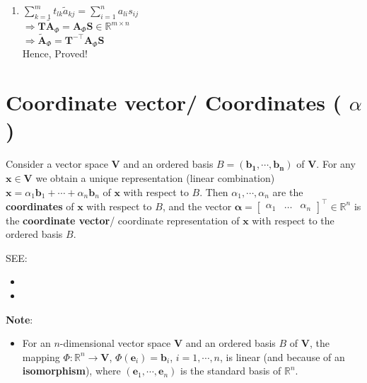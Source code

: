 \begin{enumerate}
    \item \( \displaystyle
        \sum_{k=1}^{m} t_{lk}\tilde{a}_{kj} = \sum_{i=1}^{n} a_{li}s_{ij} 
    \)\\
    \(
        \Rightarrow \mathbf{T\tilde{A}}_\Phi = \mathbf{A}_\Phi \mathbf{S} \in \mathbb{R}^{m\times n}
    \)\\
    \(
        \Rightarrow \mathbf{\tilde{A}}_\Phi = \mathbf{T^{-\top}A}_\Phi \mathbf{S}
    \)\\
    Hence, Proved!
    
\end{enumerate}








\section{Coordinate vector/ Coordinates ( $\alpha$ ) \cite{mfml-1}}\label{Coordinate vector}\label{Coordinates}

Consider a vector space $\mathbf{V}$ and an ordered basis $\mathit{B} = \mathbf{(b_1, \cdots , b_n)}$ of $\mathbf{V}$. For any $\mathbf{x \in V}$ we obtain a unique representation (linear combination) \( \mathbf{x} = \alpha_1\mathbf{b}_1 + \cdots + \alpha_n\mathbf{b}_n \) of $\mathbf{x}$ with respect to $\mathit{B}$. Then $\alpha_1, \cdots , \alpha_n$ are the \textbf{coordinates} of $\mathbf{x}$ with respect to $\mathit{B}$, and the vector \( \displaystyle \bm{\alpha} = \begin{bmatrix} \alpha_1 & \hdots & \alpha_n \end{bmatrix}^\top \in \mathbb{R}^n \) is the \textbf{coordinate vector}/ coordinate representation of $\mathbf{x}$ with respect to the ordered basis $\mathit{B}$.


\noindent SEE:
\begin{itemize}
    \item {}
    \item {} 
\end{itemize}

\vspace{0.2cm}
\noindent \textbf{Note}:
\begin{itemize}
    \item For an $n$-dimensional vector space $\mathbf{V}$ and an ordered basis $\mathit{B}$ of $\mathbf{V}$, the mapping $\Phi : \mathbb{R}^n \to \mathbf{V}$, $\Phi(\mathbf{e}_i) = \mathbf{b}_i$, $i = 1, \cdots , n$, is linear (and because of  an \textbf{isomorphism}), where $(\mathbf{e}_1, \cdots , \mathbf{e}_n)$ is the standard basis of $\mathbb{R}^n$.
\end{itemize}




